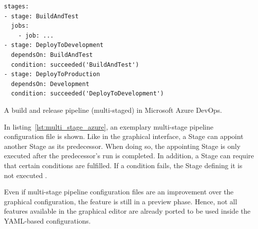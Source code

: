 \begin{listing}
\begin{verbatim}
stages:
- stage: BuildAndTest
  jobs:
    - job: ...
- stage: DeployToDevelopment
  dependsOn: BuildAndTest
  condition: succeeded('BuildAndTest')
- stage: DeployToProduction
  dependsOn: Development
  condition: succeeded('DeployToDevelopment')
\end{verbatim}
\caption{A build and release pipeline (multi-staged) in Microsoft Azure DevOps.}
\label{lst:multi_stage_azure}
\end{listing}

In listing~\ref{lst:multi_stage_azure}, an exemplary multi-stage pipeline
configuration file is shown. Like in the graphical interface, a Stage can
appoint another Stage as its predecessor. When doing so, the appointing Stage
is only executed after the predecessor's run is completed. In addition, a Stage
can require that certain conditions are fulfilled. If a condition fails, the
Stage defining it is not executed \autocite{MicrosoftStages2019}.

Even if multi-stage pipeline configuration files are an improvement over the
graphical configuration, the feature is still in a preview phase. Hence, not
all features available in the graphical editor are already ported to be used
inside the YAML-based configurations.
